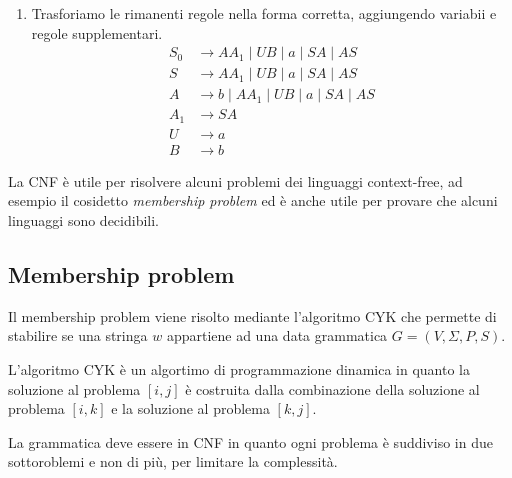 \documentclass[12pt]{report}
\begin{document}
\begin{example}{}{}
\begin{enumerate}
\begin{align*}
		B &\to b
	\end{align*}
	Eliminiamo le regole unitarie $A \to B$ e $A \to S$.
	\begin{align*}
		S_0 &\to ASA \mid aB \mid a \mid SA \mid AS \\
		S &\to ASA \mid aB \mid a \mid SA \mid AS \\
		A &\to b \mid ASA \mid aB \mid a \mid SA \mid AS \\
		B &\to b
	\end{align*}
	\item Trasforiamo le rimanenti regole nella forma corretta, aggiungendo variabii e regole supplementari.
	\begin{align*}
		S_0 &\to AA_1 \mid UB \mid a \mid SA \mid AS \\
		S &\to AA_1 \mid UB \mid a \mid SA \mid AS \\
		A &\to b \mid AA_1 \mid UB \mid a \mid SA \mid AS \\
		A_1 &\to SA \\
		U &\to a \\
		B &\to b
	\end{align*}
\end{enumerate}
\end{example}
La CNF è utile per risolvere alcuni problemi dei linguaggi context-free, ad esempio il cosidetto \textit{membership problem} ed è anche utile per provare che alcuni linguaggi sono decidibili.
\subsection{Membership problem}
Il membership problem viene risolto mediante l'algoritmo CYK che permette di stabilire se una stringa $w$ appartiene ad una data grammatica $G = (V, \Sigma, P, S)$.

L'algoritmo CYK è un algortimo di programmazione dinamica in quanto la soluzione al problema $[i, j]$ è costruita dalla combinazione della soluzione al problema $[i, k]$ e la soluzione al problema $[k, j]$.

La grammatica deve essere in CNF in quanto ogni problema è suddiviso in due sottoroblemi e non di più, per limitare la complessità.
\end{document}
